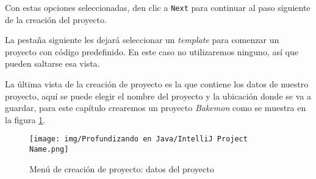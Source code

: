   Con estas opciones seleccionadas, den clic a \texttt{Next} para continuar al paso 
  siguiente de la creación del proyecto.

  La pestaña siguiente les dejará seleccionar un \textit{template} para comenzar un 
  proyecto con código predefinido.
  En este caso no utilizaremos ninguno, así que pueden saltarse esa vista.

  La última vista de la creación de proyecto es la que contiene los datos de nuestro proyecto, 
  aquí se puede elegir el nombre del proyecto y la ubicación donde se va a guardar, para este 
  capítulo crearemos un proyecto \textit{Bakemon} como se muestra en la figura 
  \ref{fig:intellij-project-3}.
  
  \begin{figure}[ht!]
    \centering
    \texttt{[image: img/Profundizando en Java/IntelliJ Project Name.png]}
    \caption{Menú de creación de proyecto: datos del proyecto}
    \label{fig:intellij-project-3}
  \end{figure}
%